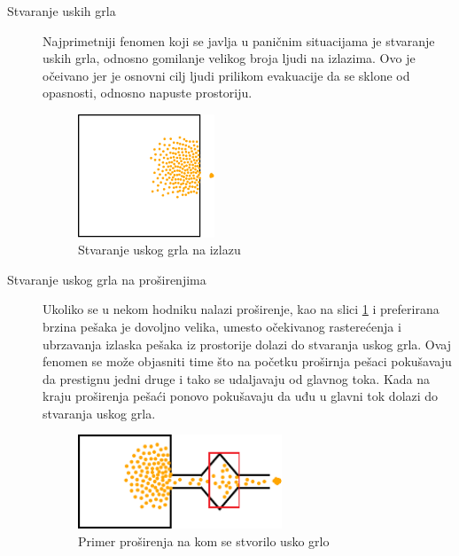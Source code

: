 \documentclass[12pt]{article}
\begin{document}
\begin{description}
\item[Stvaranje uskih grla]
Najprimetniji fenomen koji se javlja u paničnim situacijama je stvaranje uskih grla, odnosno gomilanje velikog broja ljudi na izlazima. Ovo je očeivano jer je osnovni cilj ljudi prilikom evakuacije da se sklone od opasnosti, odnosno napuste prostoriju.
\begin{figure}[H]
\centering
\includegraphics[width=0.4\textwidth]{01_Zagusenje_na_izlazu}
\caption{Stvaranje uskog grla na izlazu}
\end{figure}

\item[Stvaranje uskog grla na proširenjima]
Ukoliko se u nekom hodniku nalazi proširenje, kao na slici \ref{fig:guzva} i preferirana brzina pešaka je dovoljno velika, umesto očekivanog rasterećenja i ubrzavanja izlaska pešaka iz prostorije dolazi do stvaranja uskog grla. Ovaj fenomen se može objasniti time što na početku proširnja pešaci pokušavaju da prestignu jedni druge i tako se udaljavaju od glavnog toka. Kada na kraju proširenja pešaći ponovo pokušavaju da uđu u glavni tok dolazi do stvaranja uskog grla.
\begin{figure}[H]
\centering
\includegraphics[width=0.6\textwidth]{02_Prosirenje_usko_grlo}
\caption{Primer proširenja na kom se stvorilo usko grlo}
\label{fig:guzva}
\end{figure}


\end{description}
\end{document}
